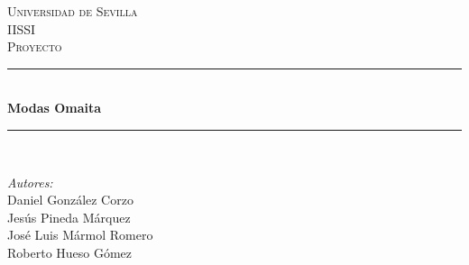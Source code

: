 \newcommand{\requit}[5]{\hrulefill \newline \textbf{#1} - #2 \requisito{#3}{#4}{#5}}

\newcommand{\prueba}[3]{\begin{itemize}
		\item \textbf{Como} #1 \item \textbf{Quiero} #2 \item \textbf{Para} #3
\end{itemize}}



\begin{titlepage}

\newcommand{\HRule}{\rule{\linewidth}{0.5mm}} %

\center %
 

\textsc{\LARGE Universidad de Sevilla}\\[1.5cm] %
\textsc{\Large IISSI}\\[0.5cm] %
\textsc{\large Proyecto}\\[0.5cm] %


\HRule \\[0.4cm]
{ \huge \bfseries Modas Omaita}\\[0.4cm] %
\HRule \\[1.5cm]
 
\begin{minipage}{0.5\textwidth}
\large
\emph{Autores:}\\
Daniel González Corzo\\
Jesús Pineda Márquez\\
José Luis Mármol Romero \\
Roberto Hueso Gómez
\end{minipage}


\end{titlepage}
